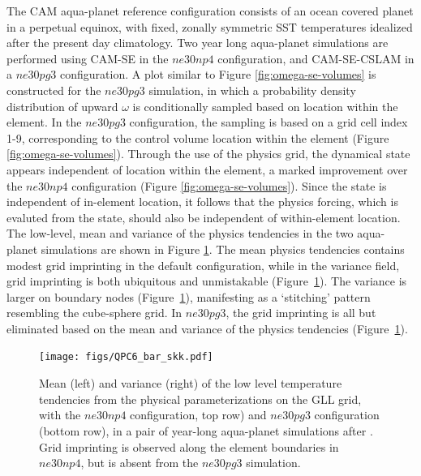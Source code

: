 \documentclass[twocol]{ametsoc}
\begin{document}
The CAM aqua-planet reference configuration \citep{NH2000ASL,MWO2016JAMES} consists of an ocean covered planet in a perpetual equinox, with fixed, zonally symmetric SST temperatures idealized after the present day climatology. Two year long aqua-planet simulations are performed using CAM-SE in the $ne30np4$ configuration, and CAM-SE-CSLAM in a $ne30pg3$ configuration. A plot similar to Figure \ref{fig:omega-se-volumes} is constructed for the $ne30pg3$ simulation, in which a probability density distribution of upward $\omega$ is conditionally sampled based on location within the element. In the $ne30pg3$ configuration, the sampling is based on a grid cell index 1-9, corresponding to the control volume location within the element (Figure \ref{fig:omega-se-volumes}). Through the use of the physics grid, the dynamical state appears independent of location within the element, a marked improvement over the $ne30np4$ configuration (Figure \ref{fig:omega-se-volumes}). Since the state is independent of in-element location, it follows that the physics forcing, which is evaluted from the state, should also be independent of within-element location. The low-level, mean and variance of the physics tendencies in the two aqua-planet simulations are shown in Figure \ref{fig:tendency_imprint}. The mean physics tendencies contains modest grid imprinting in the default configuration, while in the variance field, grid imprinting is both ubiquitous and unmistakable (Figure~\ref{fig:tendency_imprint}). The variance is larger on boundary nodes (Figure~\ref{fig:tendency_imprint}), manifesting as a `stitching' pattern resembling the cube-sphere grid. In $ne30pg3$, the grid imprinting is all but eliminated based on the mean and variance of the physics tendencies (Figure~\ref{fig:tendency_imprint}).

\begin{figure}[t]
\noindent\texttt{[image: figs/QPC6\_bar\_skk.pdf]}\\
\caption{Mean (left) and variance (right) of the low level temperature tendencies from the physical parameterizations on the GLL grid, with the $ne30np4$ configuration, top row) and $ne30pg3$ configuration (bottom row), in a pair of year-long aqua-planet simulations after \cite{MWO2016JAMES}. Grid imprinting is observed along the element boundaries in $ne30np4$, but is absent from the $ne30pg3$ simulation.}
\label{fig:tendency_imprint}
\end{figure}
\end{document}

